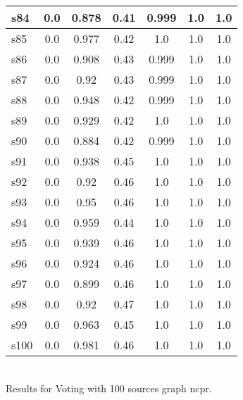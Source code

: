 \documentclass{article}
\begin{document}
\begin{tabular}{|l|c|c|c|c|c|c|}
\hline
s84 &0.0 & 0.878 & 0.41 & 0.999 & 1.0 & 1.0\\
\hline
s85 &0.0 & 0.977 & 0.42 & 1.0 & 1.0 & 1.0\\
\hline
s86 &0.0 & 0.908 & 0.43 & 0.999 & 1.0 & 1.0\\
\hline
s87 &0.0 & 0.92 & 0.43 & 0.999 & 1.0 & 1.0\\
\hline
s88 &0.0 & 0.948 & 0.42 & 0.999 & 1.0 & 1.0\\
\hline
s89 &0.0 & 0.929 & 0.42 & 1.0 & 1.0 & 1.0\\
\hline
s90 &0.0 & 0.884 & 0.42 & 0.999 & 1.0 & 1.0\\
\hline
s91 &0.0 & 0.938 & 0.45 & 1.0 & 1.0 & 1.0\\
\hline
s92 &0.0 & 0.92 & 0.46 & 1.0 & 1.0 & 1.0\\
\hline
s93 &0.0 & 0.95 & 0.46 & 1.0 & 1.0 & 1.0\\
\hline
s94 &0.0 & 0.959 & 0.44 & 1.0 & 1.0 & 1.0\\
\hline
s95 &0.0 & 0.939 & 0.46 & 1.0 & 1.0 & 1.0\\
\hline
s96 &0.0 & 0.924 & 0.46 & 1.0 & 1.0 & 1.0\\
\hline
s97 &0.0 & 0.899 & 0.46 & 1.0 & 1.0 & 1.0\\
\hline
s98 &0.0 & 0.92 & 0.47 & 1.0 & 1.0 & 1.0\\
\hline
s99 &0.0 & 0.963 & 0.45 & 1.0 & 1.0 & 1.0\\
\hline
s100 &0.0 & 0.981 & 0.46 & 1.0 & 1.0 & 1.0\\
\hline
\end{tabular}\\

\noindent Results for Voting with 100 sources graph ncpr.
\end{document}
